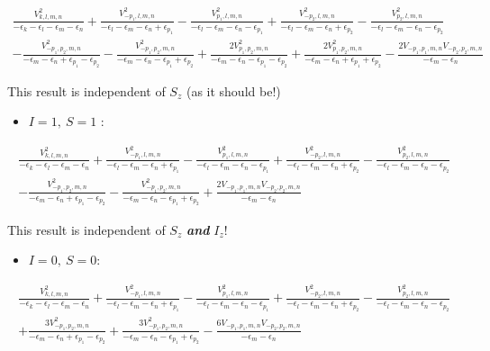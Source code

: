 \documentclass[
  letterpaper,
  DIV=11,
  numbers=noendperiod]{scrartcl}
\providecommand{\tightlist}{%
  \setlength{\itemsep}{0pt}\setlength{\parskip}{0pt}}
\begin{document}
\begin{multline}
\frac{V_{k,l,m,n}^2}{-\epsilon _k-\epsilon _l-\epsilon _m-\epsilon _n}+\frac{V_{-p_1,l,m,n}^2}{-\epsilon _l-\epsilon _m-\epsilon _n+\epsilon _{p_1}}-\frac{V_{p_1,l,m,n}^2}{-\epsilon _l-\epsilon _m-\epsilon _n-\epsilon _{p_1}}+\frac{V_{-p_2,l,m,n}^2}{-\epsilon _l-\epsilon _m-\epsilon _n+\epsilon
   _{p_2}}-\frac{V_{p_2,l,m,n}^2}{-\epsilon _l-\epsilon _m-\epsilon _n-\epsilon _{p_2}}\\
   -\frac{V_{-p_1,p_2,m,n}^2}{-\epsilon _m-\epsilon _n+\epsilon _{p_1}-\epsilon _{p_2}}-\frac{V_{-p_1,p_2,m,n}^2}{-\epsilon _m-\epsilon _n-\epsilon _{p_1}+\epsilon _{p_2}}+\frac{2 V_{p_1,p_2,m,n}^2}{-\epsilon _m-\epsilon
   _n-\epsilon _{p_1}-\epsilon _{p_2}}+\frac{2 V_{p_1,p_2,m,n}^2}{-\epsilon _m-\epsilon _n+\epsilon _{p_1}+\epsilon _{p_2}}-\frac{2 V_{-p_1,p_1,m,n} V_{-p_2,p_2,m,n}}{-\epsilon _m-\epsilon _n}
\end{multline}

This result is independent of \(S_z\) (as it should be!)

\begin{itemize}
\tightlist
\item
  \(I=1,\ S=1\) :
\end{itemize}

\begin{multline}
\frac{V_{k,l,m,n}^2}{-\epsilon _k-\epsilon _l-\epsilon _m-\epsilon _n}+\frac{V_{-p_1,l,m,n}^2}{-\epsilon _l-\epsilon _m-\epsilon _n+\epsilon
   _{p_1}}-\frac{V_{p_1,l,m,n}^2}{-\epsilon _l-\epsilon _m-\epsilon _n-\epsilon _{p_1}}+\frac{V_{-p_2,l,m,n}^2}{-\epsilon _l-\epsilon _m-\epsilon _n+\epsilon
   _{p_2}}-\frac{V_{p_2,l,m,n}^2}{-\epsilon _l-\epsilon _m-\epsilon _n-\epsilon _{p_2}}\\
   -\frac{V_{-p_1,p_2,m,n}^2}{-\epsilon _m-\epsilon _n+\epsilon _{p_1}-\epsilon
   _{p_2}}-\frac{V_{-p_1,p_2,m,n}^2}{-\epsilon _m-\epsilon _n-\epsilon _{p_1}+\epsilon _{p_2}}+\frac{2 V_{-p_1,p_1,m,n} V_{-p_2,p_2,m,n}}{-\epsilon _m-\epsilon _n}
\end{multline}

This result is independent of \(S_z\) \textbf{\emph{and}} \(I_z\)!

\begin{itemize}
\tightlist
\item
  \(I=0,\ S=0\):
\end{itemize}

\begin{multline}
\frac{V_{k,l,m,n}^2}{-\epsilon _k-\epsilon _l-\epsilon _m-\epsilon _n}+\frac{V_{-p_1,l,m,n}^2}{-\epsilon _l-\epsilon _m-\epsilon _n+\epsilon
   _{p_1}}-\frac{V_{p_1,l,m,n}^2}{-\epsilon _l-\epsilon _m-\epsilon _n-\epsilon _{p_1}}+\frac{V_{-p_2,l,m,n}^2}{-\epsilon _l-\epsilon _m-\epsilon _n+\epsilon
   _{p_2}}-\frac{V_{p_2,l,m,n}^2}{-\epsilon _l-\epsilon _m-\epsilon _n-\epsilon _{p_2}}\\
   +\frac{3 V_{-p_1,p_2,m,n}^2}{-\epsilon _m-\epsilon _n+\epsilon _{p_1}-\epsilon
   _{p_2}}+\frac{3 V_{-p_1,p_2,m,n}^2}{-\epsilon _m-\epsilon _n-\epsilon _{p_1}+\epsilon _{p_2}}-\frac{6 V_{-p_1,p_1,m,n} V_{-p_2,p_2,m,n}}{-\epsilon _m-\epsilon _n}
\end{multline}
\end{document}
